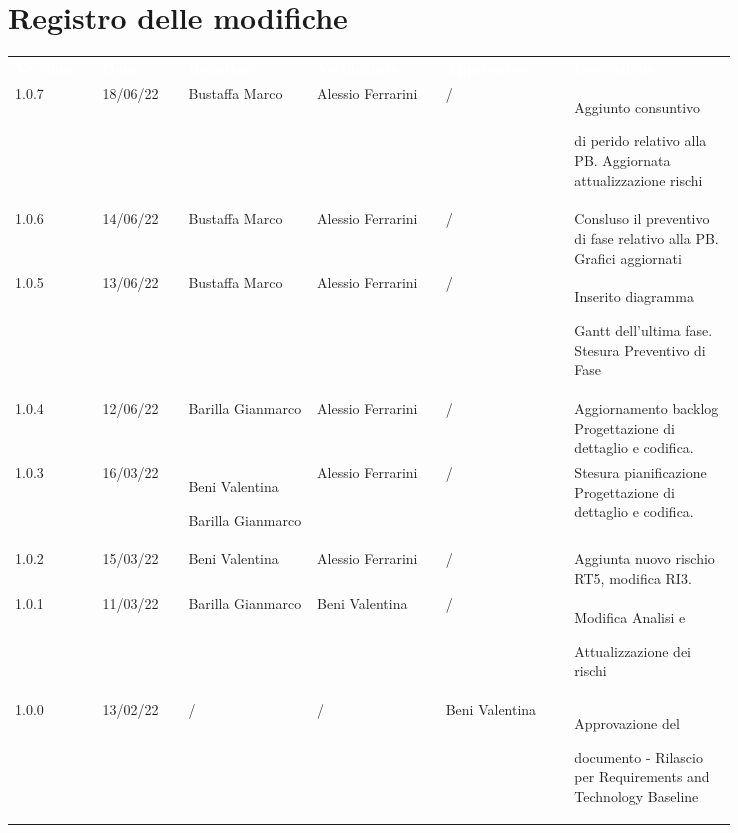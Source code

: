 \section*{Registro delle modifiche}

{\renewcommand{\arraystretch}{1.5}
\scriptsize
\begin{tabular}{p{0.10\linewidth}p{0.10\linewidth}p{0.15\linewidth}p{0.15\linewidth}p{0.15\linewidth}p{0.19\linewidth}}
	\rowcolor[RGB]{33, 73, 50}
	\textcolor{white}{\textbf{Versione}} & \textcolor{white}{\textbf{Data}} &
	\textcolor{white}{\textbf{Redattore}} & \textcolor{white}{\textbf{Verificatore}} &
	\textcolor{white}{\textbf{Approvatore}} & \textcolor{white}{\textbf{Descrizione}}\\
	
	\rowcolor[RGB]{216, 235, 171}
	1.0.7 & 18/06/22 & Bustaffa Marco & Alessio Ferrarini & / & Aggiunto consuntivo \par di perido relativo alla PB. Aggiornata attualizzazione rischi\\
	\rowcolor[RGB]{233, 245, 206}
	1.0.6 & 14/06/22 & Bustaffa Marco & Alessio Ferrarini & / & Consluso il preventivo di fase relativo alla PB. Grafici aggiornati\\
	\rowcolor[RGB]{216, 235, 171}
	1.0.5 & 13/06/22 & Bustaffa Marco & Alessio Ferrarini & / & Inserito diagramma \par Gantt dell'ultima fase. Stesura Preventivo di Fase\\
	\rowcolor[RGB]{233, 245, 206}
	1.0.4 & 12/06/22 & Barilla Gianmarco & Alessio Ferrarini & / & Aggiornamento backlog Progettazione di dettaglio e codifica.\\
	\rowcolor[RGB]{216, 235, 171}
	1.0.3 & 16/03/22 & Beni Valentina \par Barilla Gianmarco & Alessio Ferrarini & / & Stesura pianificazione Progettazione di dettaglio e codifica.\\
	\rowcolor[RGB]{233, 245, 206}
	1.0.2 & 15/03/22 & Beni Valentina & Alessio Ferrarini & / & Aggiunta nuovo rischio RT5, modifica RI3.\\
	\rowcolor[RGB]{216, 235, 171}
	1.0.1 & 11/03/22 & Barilla Gianmarco& Beni Valentina & / & Modifica Analisi e\par Attualizzazione dei rischi\\
	\rowcolor[RGB]{233, 245, 206}
	1.0.0 & 13/02/22 & / & / & Beni Valentina & Approvazione del \par documento - Rilascio per Requirements and Technology Baseline\\

\end{tabular}}

